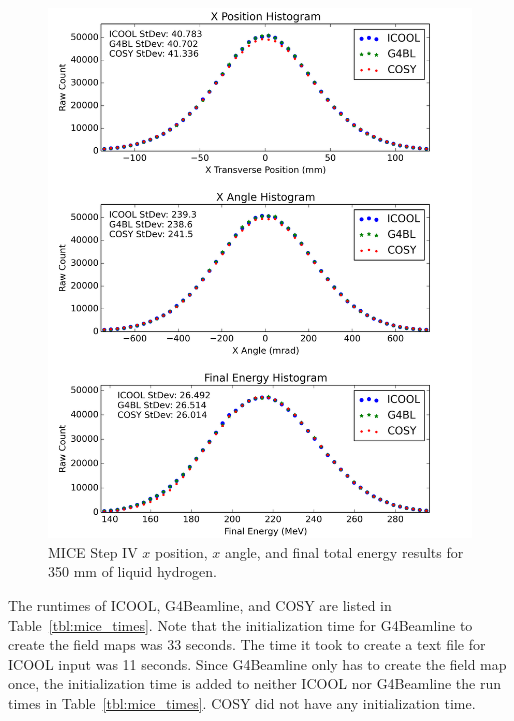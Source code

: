 \documentclass{jacow}
\begin{document}
\begin{figure}[htb]
  \centering
    \includegraphics[width=\columnwidth]{Figures/MICE_LH} 
  \caption{MICE Step IV $x$ position, $x$ angle, and final total energy results for 350 mm of liquid hydrogen.}
  \label{fig:MICE_LH}
\end{figure}

The runtimes of ICOOL, G4Beamline, and COSY are listed in Table~\ref{tbl:mice_times}. %
Note that the initialization time for G4Beamline to create the field maps was 33 seconds. The time it took to create a text file for ICOOL input was 11 seconds. Since G4Beamline only has to create the field map once, the initialization time is added to neither ICOOL nor G4Beamline the run times in Table~\ref{tbl:mice_times}. COSY did not have any initialization time.
\end{document}
